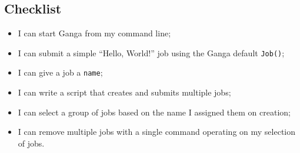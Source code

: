 \subsection{Checklist}
\label{first-steps-hello-worlds---checklist}

\begin{itemize}
\tightlist
\item
  I can start Ganga from my command line;
\item
  I can submit a simple ``Hello, World!'' job using the Ganga default
  \texttt{Job()};
\item
  I can give a job a \texttt{name};
\item
  I can write a script that creates and submits multiple jobs;
\item
  I can select a group of jobs based on the name I assigned them on
  creation;
\item
  I can remove multiple jobs with a single command operating on my
  selection of jobs.
\end{itemize}
